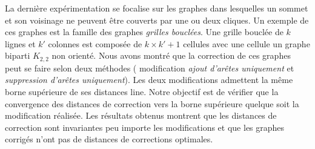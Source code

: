 La derni\`ere exp\'erimentation se focalise sur les graphes dans lesquelles un sommet et son voisinage ne peuvent \^etre couverts par une ou deux cliques. Un exemple de ces graphes est la famille des graphes {\em grilles boucl\'ees}. Une grille boucl\'ee de  $k$  lignes et $k'$ colonnes est compos\'ee de $k \times k' +1$ cellules avec une cellule un graphe biparti $K_{2,2}$ non orient\'e.
Nous avons montr\'e que la correction de ces graphes peut se faire selon deux m\'ethodes ( modification  {\em ajout d'ar\^etes uniquement} et {\em suppression d'ar\^etes uniquement}). Les deux modifications admettent la m\^eme borne sup\'erieure de ses distances line. 
 Notre objectif est de v\'erifier que la convergence  des distances de correction  vers la borne sup\'erieure quelque soit la modification r\'ealis\'ee. 
 Les r\'esultats obtenus montrent que les distances de correction sont invariantes peu importe les modifications et que les  graphes corrig\'es n'ont pas de distances de corrections optimales. 
 \newline
